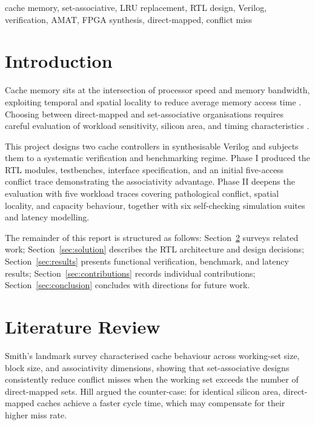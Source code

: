 \documentclass[conference]{IEEEtran}
\begin{document}
\begin{IEEEkeywords}
cache memory, set-associative, LRU replacement, RTL design, Verilog,
verification, AMAT, FPGA synthesis, direct-mapped, conflict miss
\end{IEEEkeywords}

\section{Introduction}
\label{sec:intro}

Cache memory sits at the intersection of processor speed and memory
bandwidth, exploiting temporal and spatial locality to reduce average
memory access time \cite{smith1982}.
Choosing between direct-mapped and set-associative organisations requires
careful evaluation of workload sensitivity, silicon area, and timing
characteristics \cite{hill1988,przybylski1988}.

This project designs two cache controllers in synthesisable Verilog and
subjects them to a systematic verification and benchmarking regime.
Phase I \cite{ieee-verilog2001} produced the RTL modules, testbenches,
interface specification, and an initial five-access conflict trace
demonstrating the associativity advantage.
Phase II deepens the evaluation with five workload traces covering
pathological conflict, spatial locality, and capacity behaviour, together
with six self-checking simulation suites and latency modelling.

The remainder of this report is structured as follows:
Section~\ref{sec:litreview} surveys related work;
Section~\ref{sec:solution} describes the RTL architecture and design
decisions;
Section~\ref{sec:results} presents functional verification, benchmark, and
latency results;
Section~\ref{sec:contributions} records individual contributions;
Section~\ref{sec:conclusion} concludes with directions for future work.

\section{Literature Review}
\label{sec:litreview}

Smith's landmark survey \cite{smith1982} characterised cache behaviour
across working-set size, block size, and associativity dimensions, showing
that set-associative designs consistently reduce conflict misses when the
working set exceeds the number of direct-mapped sets.
Hill \cite{hill1988} argued the counter-case: for identical silicon area,
direct-mapped caches achieve a faster cycle time, which may compensate for
their higher miss rate.
\end{document}
